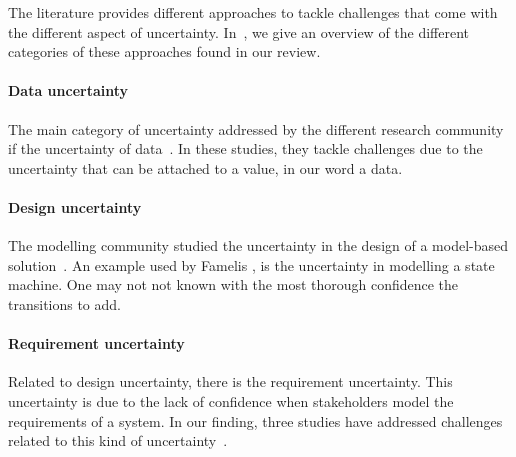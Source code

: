 The literature provides different approaches to tackle challenges that come with the different aspect of uncertainty.
In~, we give an overview of the different categories of these approaches found in our review.

\paragraph{Data uncertainty}
The main category of uncertainty addressed by the different research community if the uncertainty of data~\cite{DBLP:conf/models/BurguenoBMV18, baudin2017openturns, DBLP:journals/corr/BorgstromGGMG13, DBLP:conf/ecmdafa/BertoaMBBTV18, DBLP:conf/asplos/BornholtMM14, osti_1430202, DBLP:conf/sle/MayerhoferWV16, DBLP:journals/peerj-cs/SalvatierWF16, DBLP:conf/quatic/VallecilloMO16, DBLP:journals/sosym/Zhang00NO19, DBLP:journals/csi/Hall06, DBLP:journals/infsof/Jimenez-RamirezW0V15, DBLP:conf/ecmdafa/ZhangSAYON16, DBLP:journals/tkde/BarbaraGP92, DBLP:conf/vldb/BenjellounSHW06, DBLP:conf/popl/BhatAVG12, DBLP:conf/aistats/ChagantyNR13, DBLP:journals/siamsc/JaroszewiczK12, DBLP:journals/toplas/ParkPT08, DBLP:conf/ijcai/Pfeffer01, DBLP:conf/popl/RamseyP02, DBLP:conf/pldi/SankaranarayananCG13, DBLP:conf/uist/SchwarzMH11, DBLP:conf/icra/Thrun00, DBLP:journals/sac/LunnTBS00, plummer2003jags}.
In these studies, they tackle challenges due to the uncertainty that can be attached to a value, in our word a data.


\paragraph{Design uncertainty}
The modelling community studied the uncertainty in the design of a model-based solution~\cite{DBLP:conf/icse/FamelisSC12, DBLP:journals/sosym/FamelisC19, DBLP:conf/sle/EramoPR15, DBLP:conf/icse/EramoPR14, DBLP:journals/re/SalayCHS13, DBLP:conf/ecmdafa/ZhangSAYON16}.
An example used by Famelis \etal \cite{DBLP:conf/icse/FamelisSC12}, is the uncertainty in modelling a state machine.
One may not not known with the most thorough confidence the transitions to add.

\paragraph{Requirement uncertainty}
Related to design uncertainty, there is the requirement uncertainty.
This uncertainty is due to the lack of confidence when stakeholders model the requirements of a system.
In our finding, three studies have addressed challenges related to this kind of uncertainty~\cite{DBLP:journals/re/WhittleSBCB10, DBLP:conf/re/WhittleSBCB09, DBLP:journals/re/SalayCHS13}.
	
